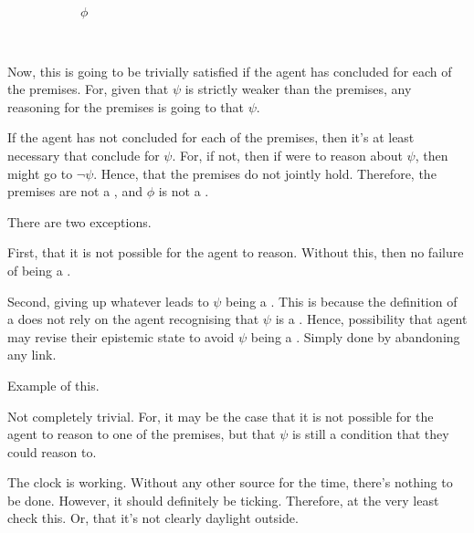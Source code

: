 \begin{figure}
\begin{subfigure}{0.3\linewidth}
    \caption{\(\phi\)}
  \end{subfigure}
  \hfill\mbox{ }
  \caption{\prequ{}}
  \label{fig:prequ:intuition}
\end{figure}

\begin{note}
  Now, this is going to be trivially satisfied if the agent has concluded for each of the premises.
  For, given that \(\psi\) is strictly weaker than the premises, any reasoning for the premises is going to \indicateV{} that \(\psi\).
\end{note}

\begin{note}
  If the agent has not concluded for each of the premises, then it's at least necessary that conclude for \(\psi\).
  For, if not, then if were to reason about \(\psi\), then might go to \(\lnot\psi\).
  Hence, that the premises do not jointly hold.
  Therefore, the premises are not a \sink{}, and \(\phi\) is not a \sink{}.
\end{note}

\begin{note}
  There are two exceptions.

  First, that it is not possible for the agent to reason.
  Without this, then no failure of being a \sink{}.

  Second, giving up whatever leads to \(\psi\) being a \prequ{}.
  This is because the definition of a \prequ{} does not rely on the agent recognising that \(\psi\) is a \prequ{}.
  Hence, possibility that agent may revise their epistemic state to avoid \(\psi\) being a \prequ{}.
  Simply done by abandoning any link.

  Example of this.
\end{note}

\begin{note}
  Not completely trivial.
  For, it may be the case that it is not possible for the agent to reason to one of the premises, but that \(\psi\) is still a condition that they could reason to.

  The clock is working.
  Without any other source for the time, there's nothing to be done.
  However, it should definitely be ticking.
  Therefore, at the very least check this.
  Or, that it's not clearly daylight outside.
\end{note}

